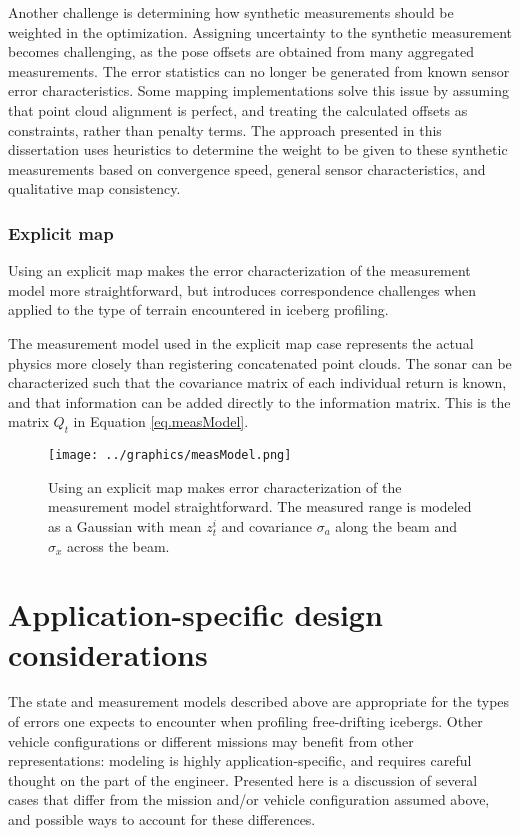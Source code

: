 Another challenge is determining how synthetic measurements should be weighted in the optimization. Assigning uncertainty to the synthetic measurement becomes challenging, as the pose offsets are obtained from many aggregated measurements. The error statistics can no longer be generated from known sensor error characteristics. Some mapping implementations solve this issue by assuming that point cloud alignment is perfect, and treating the calculated offsets as constraints, rather than penalty terms. The approach presented in this dissertation uses heuristics to determine the weight to be given to these synthetic measurements based on convergence speed, general sensor characteristics, and qualitative map consistency. 



\subsubsection{Explicit map}

Using an explicit map makes the error characterization of the measurement model more straightforward, but introduces correspondence challenges when applied to the type of terrain encountered in iceberg profiling. 

The measurement model used in the explicit map case represents the actual physics more closely than registering concatenated point clouds. The sonar can be characterized such that the covariance matrix of each individual return is known, and that information can be added directly to the information matrix. This is the matrix $Q_t$ in Equation \ref{eq.measModel}.

\begin{figure}[htbp]
   \centering
   \texttt{[image: ../graphics/measModel.png]} %
   \caption{Using an explicit map makes error characterization of the measurement model straightforward. The measured range is modeled as a Gaussian with mean $z_t^i$ and covariance $\sigma_{a}$ along the beam and $\sigma_{x}$ across the beam.}
   \label{fig:GraphSLAM}
\end{figure}


\section{Application-specific design considerations}

The state and measurement models described above are appropriate for the types of errors one expects to encounter when profiling free-drifting icebergs. Other vehicle configurations or different missions may benefit from other representations: modeling is highly application-specific, and requires careful thought on the part of the engineer. Presented here is a discussion of several cases that differ from the mission and/or vehicle configuration assumed above, and possible ways to account for these differences.

